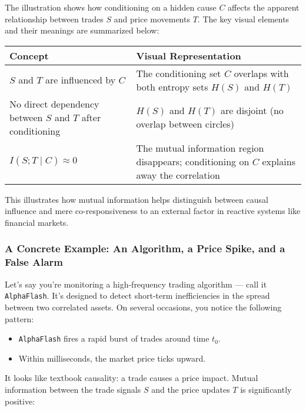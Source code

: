 \noindent
The illustration shows how conditioning on a hidden cause \( C \) affects the apparent relationship between trades \( S \) and price movements \( T \). The key visual elements and their meanings are summarized below:

\begin{center}
\renewcommand{\arraystretch}{1.4}
\begin{tabular}{|p{5.2cm}|p{7.4cm}|}
\hline
\textbf{Concept} & \textbf{Visual Representation} \\
\hline
\( S \) and \( T \) are influenced by \( C \) & The conditioning set \( C \) overlaps with both entropy sets \( H(S) \) and \( H(T) \) \\
\hline
No direct dependency between \( S \) and \( T \) after conditioning & \( H(S) \) and \( H(T) \) are disjoint (no overlap between circles) \\
\hline
\( I(S; T \mid C) \approx 0 \) & The mutual information region disappears; conditioning on \( C \) explains away the correlation \\
\hline
\end{tabular}
\end{center}

\vspace{1em}
\noindent
This illustrates how mutual information helps distinguish between causal influence and mere co-responsiveness to an external factor in reactive systems like financial markets.




\subsubsection{A Concrete Example: An Algorithm, a Price Spike, and a False Alarm}

\vspace{0.5em}
\noindent
Let’s say you're monitoring a high-frequency trading algorithm — call it \texttt{AlphaFlash}. It's designed to detect short-term inefficiencies in the spread between two correlated assets. On several occasions, you notice the following pattern:

\begin{itemize}
    \item \texttt{AlphaFlash} fires a rapid burst of trades around time \( t_0 \).
    \item Within milliseconds, the market price ticks upward.
\end{itemize}

It looks like textbook causality: a trade causes a price impact. Mutual information between the trade signals \( S \) and the price updates \( T \) is significantly positive:

